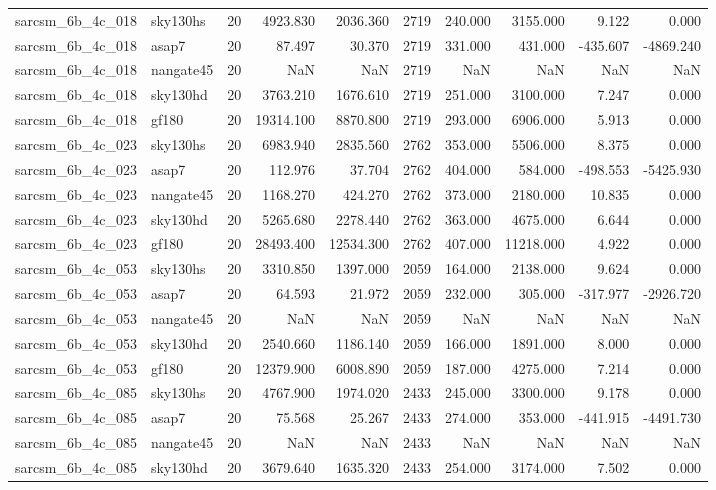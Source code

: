 \begin{tabular}{llrrrrrrrr}
sarcsm\_6b\_4c\_018 & sky130hs & 20 & 4923.830 & 2036.360 & 2719 & 240.000 & 3155.000 & 9.122 & 0.000 \\
sarcsm\_6b\_4c\_018 & asap7 & 20 & 87.497 & 30.370 & 2719 & 331.000 & 431.000 & -435.607 & -4869.240 \\
sarcsm\_6b\_4c\_018 & nangate45 & 20 & NaN & NaN & 2719 & NaN & NaN & NaN & NaN \\
sarcsm\_6b\_4c\_018 & sky130hd & 20 & 3763.210 & 1676.610 & 2719 & 251.000 & 3100.000 & 7.247 & 0.000 \\
sarcsm\_6b\_4c\_018 & gf180 & 20 & 19314.100 & 8870.800 & 2719 & 293.000 & 6906.000 & 5.913 & 0.000 \\
sarcsm\_6b\_4c\_023 & sky130hs & 20 & 6983.940 & 2835.560 & 2762 & 353.000 & 5506.000 & 8.375 & 0.000 \\
sarcsm\_6b\_4c\_023 & asap7 & 20 & 112.976 & 37.704 & 2762 & 404.000 & 584.000 & -498.553 & -5425.930 \\
sarcsm\_6b\_4c\_023 & nangate45 & 20 & 1168.270 & 424.270 & 2762 & 373.000 & 2180.000 & 10.835 & 0.000 \\
sarcsm\_6b\_4c\_023 & sky130hd & 20 & 5265.680 & 2278.440 & 2762 & 363.000 & 4675.000 & 6.644 & 0.000 \\
sarcsm\_6b\_4c\_023 & gf180 & 20 & 28493.400 & 12534.300 & 2762 & 407.000 & 11218.000 & 4.922 & 0.000 \\
sarcsm\_6b\_4c\_053 & sky130hs & 20 & 3310.850 & 1397.000 & 2059 & 164.000 & 2138.000 & 9.624 & 0.000 \\
sarcsm\_6b\_4c\_053 & asap7 & 20 & 64.593 & 21.972 & 2059 & 232.000 & 305.000 & -317.977 & -2926.720 \\
sarcsm\_6b\_4c\_053 & nangate45 & 20 & NaN & NaN & 2059 & NaN & NaN & NaN & NaN \\
sarcsm\_6b\_4c\_053 & sky130hd & 20 & 2540.660 & 1186.140 & 2059 & 166.000 & 1891.000 & 8.000 & 0.000 \\
sarcsm\_6b\_4c\_053 & gf180 & 20 & 12379.900 & 6008.890 & 2059 & 187.000 & 4275.000 & 7.214 & 0.000 \\
sarcsm\_6b\_4c\_085 & sky130hs & 20 & 4767.900 & 1974.020 & 2433 & 245.000 & 3300.000 & 9.178 & 0.000 \\
sarcsm\_6b\_4c\_085 & asap7 & 20 & 75.568 & 25.267 & 2433 & 274.000 & 353.000 & -441.915 & -4491.730 \\
sarcsm\_6b\_4c\_085 & nangate45 & 20 & NaN & NaN & 2433 & NaN & NaN & NaN & NaN \\
sarcsm\_6b\_4c\_085 & sky130hd & 20 & 3679.640 & 1635.320 & 2433 & 254.000 & 3174.000 & 7.502 & 0.000 \\

\end{tabular}

